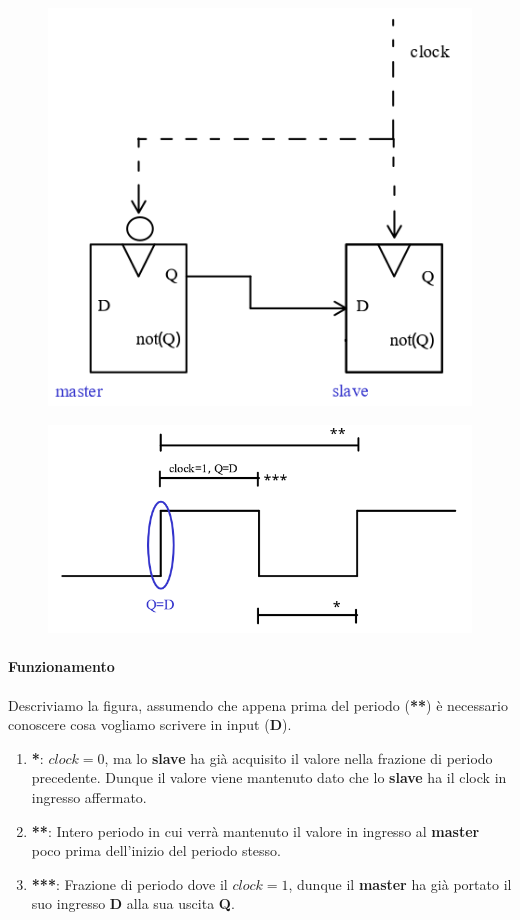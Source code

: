 \documentclass{article}
\begin{document}
\begin{figure}[htbp]
    \includegraphics[scale=0.35]{img/D_flip_flop.png}
    \centering
\end{figure}

\begin{figure}[htbp]
    \includegraphics[scale=0.25]{img/clock_flip_flop.png}
    \centering
\end{figure}

\paragraph{Funzionamento} Descriviamo la figura, assumendo che appena prima del periodo (\textbf{**}) è necessario conoscere cosa vogliamo scrivere in input (\textbf{D}).

\begin{enumerate}
    \item \textbf{*}: $clock = 0$, ma lo \textbf{slave} ha già acquisito il valore nella frazione di periodo precedente. Dunque il valore viene mantenuto dato che lo \textbf{slave} ha il clock in ingresso affermato. 
    \item \textbf{**}: Intero periodo in cui verrà mantenuto il valore in ingresso al \textbf{master} poco prima dell'inizio del periodo stesso.
    \item \textbf{***}: Frazione di periodo dove il $clock = 1$, dunque il \textbf{master} ha già portato il suo ingresso \textbf{D} alla sua uscita \textbf{Q}.
\end{enumerate}
\end{document}
